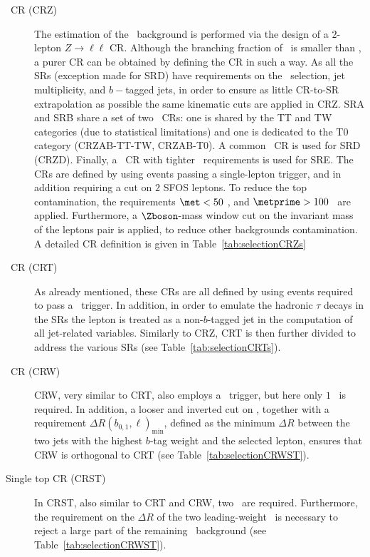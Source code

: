 			\begin{description}

				\item [\Zjets\ CR (CRZ)] The estimation of the \Znunu\ background is performed via the design of a $2$-lepton $Z \rightarrow \ell \ell$ \ac{CR}. Although the branching fraction of \Zll\ is smaller than \Znunu, a purer \ac{CR} can be obtained by defining the \ac{CR} in such a way. As all the \acp{SR} (exception made for SRD) have requirements on the \MET\ selection, jet multiplicity, and $b-$tagged jets, in order to ensure as little \ac{CR}-to-\ac{SR} extrapolation as possible the same kinematic cuts are applied in CRZ. SRA and SRB share a set of two \Zboson\ \acp{CR}: one is shared by the TT and TW categories (due to statistical limitations) and one is dedicated to the T0 category (CRZAB-TT-TW, CRZAB-T0). A common \Zboson\ \ac{CR} is used for SRD (CRZD). Finally, a \Zboson\ \ac{CR} with tighter \HT\ requirements is used for SRE. The \acp{CR} are defined by using events passing a single-lepton trigger, and in addition requiring a cut on $2$ \acl{SFOS} leptons. To reduce the top contamination, the requirements $\met < 50$ \GeV, and  $\metprime > 100$ \GeV\ are applied. Furthermore, a $\Zboson$-mass window cut on the invariant mass of the leptons pair is applied, to reduce other backgrounds contamination. A detailed \ac{CR} definition is given in Table~\ref{tab:selectionCRZs}

		
				\item [\ttbar\ CR (CRT)] As already mentioned, these \acp{CR} are all defined by using events required to pass a \met\ trigger. In addition, in order to emulate the hadronic $\tau$ decays in the \acp{SR} the lepton is treated as a non-$b$-tagged jet in the computation of all jet-related variables. Similarly to CRZ, CRT is then further divided to address the various \acp{SR} (see Table~\ref{tab:selectionCRTs}).

				\item [\Wjets\ CR (CRW)] CRW, very similar to CRT, also employs a \met\ trigger, but here only $1$ \bj\ is required. In addition, a looser and inverted cut on \mantikttwelvezero, together with a requirement $\Delta R(b_{0,1},\ell)_{\mathrm{min}}$, defined as the minimum $\Delta R$ between the two jets with the highest $b$-tag weight and the selected lepton, ensures that CRW is orthogonal to CRT (see Table~\ref{tab:selectionCRWST}). 

				\item [Single top CR (CRST)] In CRST, also similar to CRT and CRW, two \bjs\ are required. Furthermore, the requirement on the $\Delta R$ of the two leading-weight \bjs\ is necessary to reject a large part of the remaining \ttbar\ background (see Table~\ref{tab:selectionCRWST}).
			\end{description}

